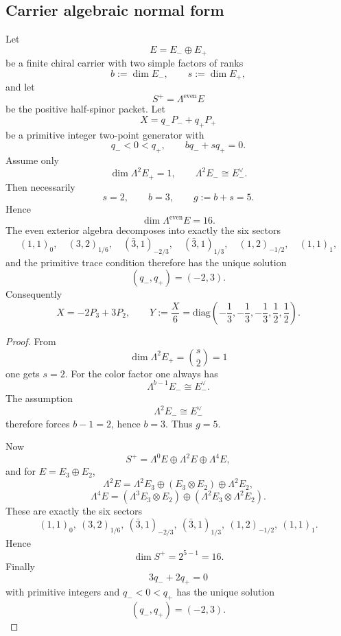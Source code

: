 
\subsection{Carrier algebraic normal form}
\label{sec:minimal-carrier-proof}

\begin{lemma}
\label{thm:carrier-minimality-k}
\label{thm:carrier-minimality-kpp}
Let
\[
E=E_-\oplus E_+
\]
be a finite chiral carrier with two simple factors of ranks
\[
b:=\dim E_-,
\qquad
s:=\dim E_+,
\]
and let
\[
S^+=\Lambda^{\mathrm{even}}E
\]
be the positive half-spinor packet. Let
\[
X=q_-P_-+q_+P_+
\]
be a primitive integer two-point generator with
\[
q_-<0<q_+,
\qquad
bq_-+sq_+=0.
\]
Assume only
\[
\dim \Lambda^2 E_+=1,
\qquad
\Lambda^2 E_- \cong E_-^\vee.
\]
Then necessarily
\[
s=2,
\qquad
b=3,
\qquad
g:=b+s=5.
\]
Hence
\[
\dim \Lambda^{\mathrm{even}}E=16.
\]
The even exterior algebra decomposes into exactly the six sectors
\[
(1,1)_0,\quad
(3,2)_{1/6},\quad
(\bar 3,1)_{-2/3},\quad
(\bar 3,1)_{1/3},\quad
(1,2)_{-1/2},\quad
(1,1)_1,
\]
and the primitive trace condition therefore has the unique solution
\[
(q_-,q_+)=(-2,3).
\]
Consequently
\[
X=-2P_3+3P_2,
\qquad
Y:=\frac{X}{6}
=
\mathrm{diag}\!\left(-\frac13,-\frac13,-\frac13,\frac12,\frac12\right).
\]
\end{lemma}

\begin{proof}
From
\[
\dim\Lambda^2 E_+=\binom{s}{2}=1
\]
one gets $s=2$. For the color factor one always has
\[
\Lambda^{b-1}E_- \cong E_-^\vee.
\]
The assumption
\[
\Lambda^2E_- \cong E_-^\vee
\]
therefore forces $b-1=2$, hence $b=3$. Thus $g=5$.

Now
\[
S^+=\Lambda^0E\oplus\Lambda^2E\oplus\Lambda^4E,
\]
and for $E=E_3\oplus E_2$,
\[
\Lambda^2E
=
\Lambda^2E_3
\oplus
(E_3\otimes E_2)
\oplus
\Lambda^2E_2,
\]
\[
\Lambda^4E
=
(\Lambda^3E_3\otimes E_2)
\oplus
(\Lambda^2E_3\otimes \Lambda^2E_2).
\]
These are exactly the six sectors
\[
(1,1)_0,\ (3,2)_{1/6},\ (\bar 3,1)_{-2/3},\ (\bar 3,1)_{1/3},\ (1,2)_{-1/2},\ (1,1)_1.
\]
Hence
\[
\dim S^+=2^{5-1}=16.
\]
Finally
\[
3q_-+2q_+=0
\]
with primitive integers and $q_-<0<q_+$ has the unique solution
\[
(q_-,q_+)=(-2,3).
\]
\end{proof}

